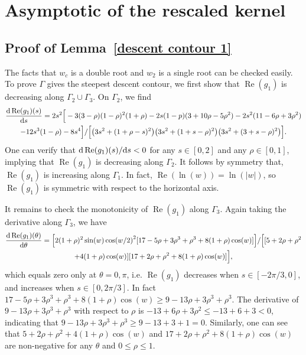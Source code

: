 \documentclass[cmp]{svjour}
\numberwithin{theorem}{section}
\numberwithin{equation}{section}
\def\dd{{\rm d}}
\DeclareMathOperator{\R}{Re}
\begin{document}
\section{Asymptotic of the rescaled kernel}

\subsection{Proof of Lemma~\ref{descent contour 1}} \label{appxs:SteepestContour1}
The facts that $w_c$ is a double root and $w_{2}$ is a single root  can be checked easily. To prove $\Gamma$ gives the steepest descent contour, we first show that $\R(g_1)$ is decreasing along $\Gamma_2\cup \Gamma_3$. On $\Gamma_2$, we find
\begin{multline*}
\frac{\dd \R(g_1)(s)}{\dd s}=
2 s^2 \Big[ - 3 (3 - \rho) (1 - \rho)^2 (1 + \rho) -
2 s (1 - p)(3 + 10 \rho - 5 \rho^2) - 2 s^2 (11 - 6 \rho + 3 \rho^2) \\
- 12 s^3 (1 - \rho) - 8 s^4\Big]/
\Big[\big(3s^2 + (1 + \rho - s)^2\big)
\big(3s^2 + (1 + s - \rho)^2\big)
\big(3s^2 + (3 + s - \rho)^2\big)\Big].
\end{multline*}
One can verify that $\dd \R(g_1)(s)/\dd s<0$ for any $s\in [0,2]$ and any $\rho\in[0,1]$, implying that $\R(g_1)$ is decreasing along $\Gamma_2$. It follows by symmetry that, $\R(g_1)$ is increasing along $\Gamma_1$. In fact, $\R(\ln(w))=\ln(|w|)$, so $\R(g_1)$ is symmetric with respect to the horizontal axis.
	
	
	
	
It remains to check the monotonicity of $\R(g_1)$ along $\Gamma_3$. Again taking the derivative along $\Gamma_3$, we have
\begin{multline*}
\frac{\dd \R(g_1)(\theta)}{\dd \theta}
= \Big[ 2 (1 + \rho)^2 \sin(w) \cos(w/2)^2 [17 - 5 \rho + 3 \rho^3 + \rho^3 + 8 (1 + \rho) \cos(w)]\Big] /\Big[[5 + 2 \rho +\rho^2
\\ + 4 (1 + \rho) \cos(w)] [17 + 2\rho +\rho^2 + 8 (1 + \rho) \cos(w)]\Big],
\end{multline*}
which equals zero only at $\theta=0,\pi$, i.e. $\R(g_1)$ decreases when $s\in[-2\pi/3,0]$, and increases when $s\in[0,2\pi/3]$. In fact $17 - 5 \rho + 3 \rho^3 + \rho^3 + 8 (1 + \rho) \cos(w)\geq 9 - 13 \rho + 3 \rho^3 + \rho^3$. The derivative of $9 - 13 \rho + 3 \rho^3 + \rho^3$ with respect to $\rho$ is $-13+6\rho+3\rho^2 \leq -13+6+3<0$, indicating that $9 - 13 \rho + 3 \rho^3 + \rho^3\geq9-13+3+1=0$. Similarly, one can see that $5 + 2 \rho +\rho^2 + 4 (1 + \rho) \cos(w) $ and $17 + 2\rho +\rho^2 + 8 (1 + \rho) \cos(w)$ are non-negative for any $\theta$ and $0\leq\rho\leq 1$.
	
\end{document}
